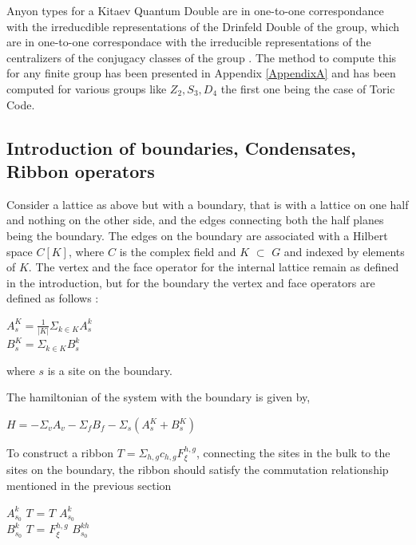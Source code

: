 Anyon types for a Kitaev Quantum Double are in one-to-one correspondance with the irreducdible representations of the Drinfeld Double of the group, which are in 
one-to-one correspondace with the irreducible representations of the centralizers of the conjugacy classes of the group \citep{Reference1}. The method to compute this for any finite
group has been presented in Appendix \ref{AppendixA} and has been computed for various groups like $Z_{2}, S_{3}, D_{4}$ the first one being the case of Toric Code.


\subsection{Introduction of boundaries, Condensates, Ribbon operators}

	Consider a lattice as above but with a boundary, that is with a lattice on one half and nothing on the other side, and the edges connecting both the half planes being
the boundary. The edges on the boundary are associated with a Hilbert space $C[K]$, where $C$ is the complex field and $K$ $\subset$ $G$ and indexed by elements of $K$. The 
vertex and the face operator for the internal lattice remain as defined in the introduction, but for the boundary the vertex and face operators are defined as follows :
\begin{center}
 $A^{K}_{s} = \frac{1}{|K|} \varSigma_{k \in K} A^{k}_{s}$ \\
 $B^{K}_{s} = \varSigma_{k \in K} B^{k}_{s}$
\end{center}
where $s$ is a site on the boundary.

The hamiltonian of the system with the boundary is given by,
\begin{center}
 $H = -\varSigma_{v} A_{v} - \varSigma_{f} B_{f} - \varSigma_{s} (A^{K}_{s} + B^{K}_{s})$
\end{center}

      To construct a ribbon $T = \varSigma_{h,g}c_{h,g}F^{h,g}_{\xi}$, connecting the sites in the bulk to the sites on the boundary, the ribbon should satisfy the commutation relationship mentioned in the 
previous section
\begin{center}
      $A^{k}_{s_{0}}$ $T$ = $T$ $A^{k}_{s_{0}}$ \\
      $B^{k}_{s_{0}}$ $T$ = $F^{h,g}_{\xi}$ $B^{kh}_{s_{0}}$ \\
\end{center}

